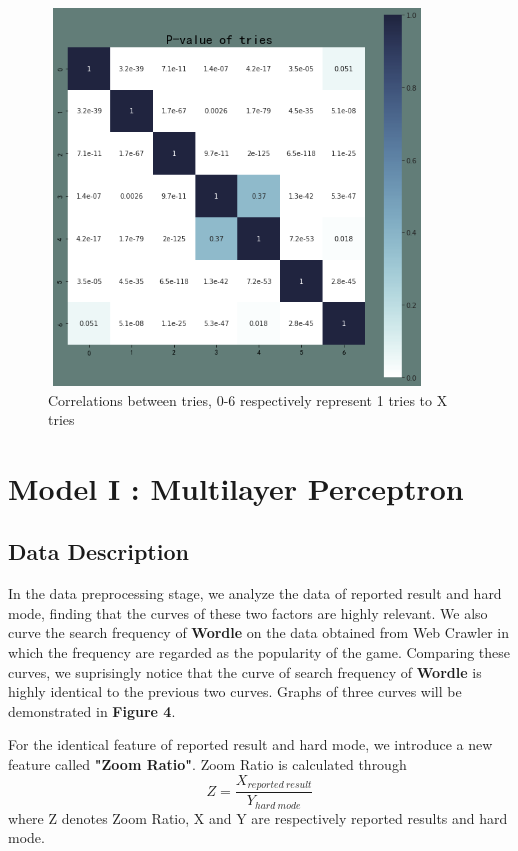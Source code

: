 \documentclass[12pt]{article}
\begin{document}
\begin{figure}
	
\centering
\includegraphics[height=10cm, width=10cm]{per_tries.png}
\caption{Correlations between tries, 0-6 respectively represent 1 tries to X tries}
\end{figure}

\section{Model I : Multilayer Perceptron}
\subsection{Data Description}

In the data preprocessing stage, we analyze the data of reported result and hard mode, finding that the curves of these two factors are highly relevant. We also curve the search frequency of \textbf{Wordle} on the data obtained from Web Crawler in which the frequency are regarded as the popularity of the game. Comparing these curves, we suprisingly notice that the curve of search frequency of \textbf{Wordle} is highly identical to the previous two curves. Graphs of three curves will be demonstrated in \textbf{Figure 4}.

For the identical feature of reported result and hard mode, we introduce a new feature called \textbf{"Zoom Ratio"}. Zoom Ratio is calculated through
\begin{equation*}
	Z = \frac{X_{reported\ result}}{Y_{hard\ mode}}
\end{equation*}
where Z denotes Zoom Ratio, X and Y are respectively reported results and hard mode.
\end{document}

